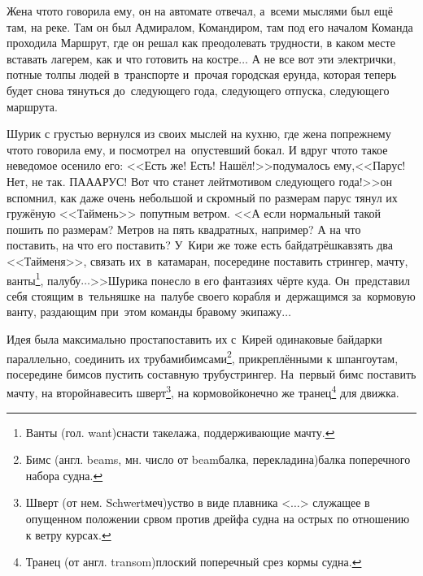 {Жена что\sdash то говорила ему, он на автомате отвечал, а~всеми мыслями был ещё там, на реке. Там он был Адмиралом, Командиром, там под его началом Команда проходила Маршрут, где он решал как преодолевать трудности, в каком месте вставать лагерем, как и что готовить на костре$\ldots$ А не все вот эти электрички, потные толпы людей в~транспорте и~прочая городская ерунда, которая теперь будет снова тянуться до~следующего года, следующего отпуска, следующего маршрута.

\renewcommand*{\thefootnote}{\arabic{footnote}}
\setcounter{footnote}{0}

Шурик с грустью вернулся из своих мыслей на кухню, где жена по\sdash прежнему что\sdash то говорила ему, и посмотрел на~опустевший бокал. И вдруг что\sdash то такое неведомое осенило его: <<Есть же! Есть! Нашёл!>>\mdash подумалось ему,\mdash <<Парус! Нет, не так. ПА\sdash А\sdash АРУС! Вот что станет лейтмотивом следующего года!>>\mdash он вспомнил, как даже очень небольшой и скромный по размерам парус тянул их гружёную <<Таймень>> попутным ветром. <<А если нормальный такой пошить по размерам? Метров на пять квадратных, например? А на что поставить, на что его поставить? У~Кири же тоже есть байда\sdash трёшка\mdash взять два <<Тайменя>>, связать их~в~катамаран, посередине поставить стрингер, мачту, ванты\footnote{Ванты (гол. want)\mdash снасти такелажа, поддерживающие мачту.}, палубу$\ldots$>>\mdash Шурика понесло в его фантазиях чёрте куда. Он~представил себя стоящим в~тельняшке на~палубе своего корабля и~держащимся за~кормовую ванту, раздающим при~этом команды бравому экипажу$\ldots$

Идея была максимально проста\mdash поставить их с~Кирей одинаковые  байдарки параллельно, соединить их трубами\sdash бимсами\footnote{Бимс (англ. beams, мн. число от beam\mdash балка, перекладина)\mdash балка поперечного набора судна.}, прикреплёнными к шпангоутам, посередине бимсов пустить составную трубу\sdash стрингер. На~первый бимс поставить мачту, на второй\mdash навесить шверт\footnote{Шверт (от нем. Schwert\mdash меч)\mdash уст\sdash во в виде плавника <$\ldots$> служащее в опущенном положении ср\sdash вом против дрейфа судна на острых по отношению к ветру курсах.}, на кормовой\mdash конечно же транец\footnote{Транец (от англ. transom)\mdash плоский поперечный срез кормы судна.} для движка.

\renewcommand*{\thefootnote}{\arabic{footnote}}
\setcounter{footnote}{0}

}
